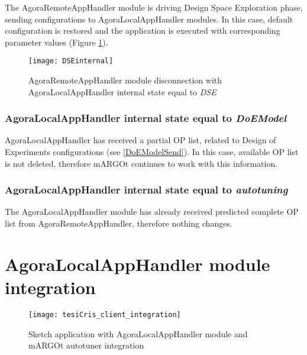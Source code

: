 The AgoraRemoteAppHandler module is driving Design Space Exploration phase, sending configurations to AgoraLocalAppHandler modules. In this case, default configuration is restored and the application is executed with corresponding parameter values (Figure \ref{fig::remDiscDSE}).

\begin{figure}[htb]

    \centering
    \texttt{[image: DSEinternal]}

    \caption{AgoraRemoteAppHandler module disconnection with A\-go\-ra\-Local\-App\-Handler internal state equal to \textit{DSE}}

    \label{fig::remDiscDSE}
    
\end{figure}


\subsubsection{AgoraLocalAppHandler internal state equal to \textit{DoEModel}}

AgoraLocalAppHandler has received a partial OP list, related to Design of Experiments configurations (see \ref{DoEModelSend}). In this case, available OP list is not deleted, therefore mARGOt continues to work with this information.


\subsubsection{AgoraLocalAppHandler internal state equal to \textit{autotuning}}

The AgoraLocalAppHandler module has already received predicted complete OP list from AgoraRemoteAppHandler, therefore nothing changes.





\section{AgoraLocalAppHandler module integration}

\begin{figure}[htb]

    \centering
    \texttt{[image: tesiCris\_client\_integration]}

    \caption{Sketch application with AgoraLocalAppHandler module and mARGOt autotuner integration}

    \label{fig::sketchApp}
    
\end{figure}

